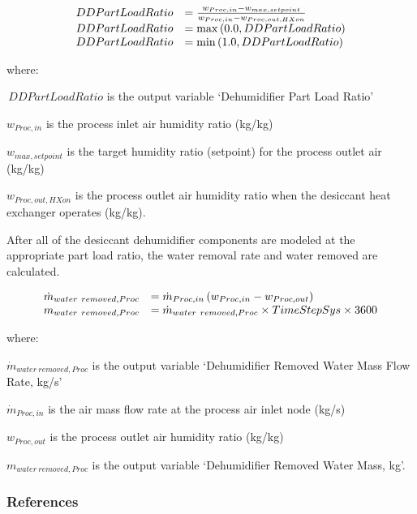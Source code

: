\begin{equation}
  \begin{array}{rl}
    DDPartLoadRatio &= \frac{w_{Proc,in} - w_{max,setpoint}}{w_{Proc,in} - w_{Proc,out,HXon}} \\
    DDPartLoadRatio &= \max\left(0.0,DDPartLoadRatio\right) \\
    DDPartLoadRatio &= \min\left(1.0,DDPartLoadRatio\right)
  \end{array}
\end{equation}

where:

\(\,DDPartLoadRatio\) is the output variable `Dehumidifier Part Load Ratio'

\({w_{Proc,in}}\) is the process inlet air humidity ratio (kg/kg)

\({w_{max,setpoint}}\) is the target humidity ratio (setpoint) for the process outlet air (kg/kg)

\({w_{Proc,out,HXon}}\) is the process outlet air humidity ratio when the desiccant heat exchanger operates (kg/kg).

After all of the desiccant dehumidifier components are modeled at the appropriate part load ratio, the water removal rate and water removed are calculated.

\begin{equation}
  \begin{array}{rl}
    \dot{m}_{water~removed,Proc} & = \dot{m}_{Proc,in} \left(w_{Proc,in} - w_{Proc,out}\right) \\
    m_{water~removed,Proc}       & = \dot{m}_{water~removed,Proc} \times TimeStepSys \times 3600
  \end{array}
\end{equation}

where:

\({\dot{m}_{water~removed,Proc}}\) is the output variable `Dehumidifier Removed Water Mass Flow Rate, kg/s'

\({\dot{m}_{Proc,in}}\) is the air mass flow rate at the process air inlet node (kg/s)

\({w_{Proc,out}}\) is the process outlet air humidity ratio (kg/kg)

\({m_{water~removed,Proc}}\) is the output variable `Dehumidifier Removed Water Mass, kg'.

\subsubsection{References}\label{references-000}

